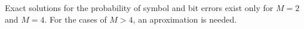 %
%
%
%
%
%
%
%
%
%
%

Exact solutions for the probability of symbol and bit errors exist only for $M=2$ and $M=4$. For the cases of $M>4$, an aproximation is needed.

